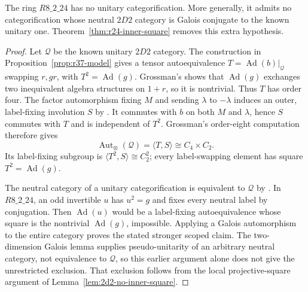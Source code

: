 \begin{proposition}\label{prop:scoped-eight}
The ring $R8\_2\_24$ has no unitary categorification. More
generally, it admits no categorification
whose neutral $2D2$ category is Galois conjugate to the known unitary
one. Theorem~\ref{thm:r24-inner-square} removes this extra hypothesis.
\end{proposition}
\begin{proof}
Let $\mathcal Q$ be the known unitary $2D2$ category. The
construction in Proposition~\ref{prop:r37-model} gives a tensor
autoequivalence $T=\operatorname{Ad}(b)|_{\mathcal Q}$ swapping
$r,gr$, with $T^2=\operatorname{Ad}(g)$. Grossman's
\cite[Lemma~4.1]{Grossman} shows that $\operatorname{Ad}(g)$ exchanges
two inequivalent algebra structures on $1+r$, so it is nontrivial.
Thus $T$ has order four. The factor automorphism fixing $M$ and
sending $\lambda$ to $-\lambda$ induces an outer, label-fixing
involution $S$ by \cite[Lemma~4.2]{Grossman}. It commutes with $b$
on both $M$ and $\lambda$, hence $S$ commutes with $T$ and is
independent of $T^2$. Grossman's order-eight computation
\cite[Theorem~4.19 and its proof]{Grossman} therefore gives
\[
\operatorname{Aut}_{\otimes}(\mathcal Q)=\langle T,S\rangle
 \cong C_4\times C_2.
\]
Its label-fixing subgroup is $\langle T^2,S\rangle\cong C_2^2$;
every label-swapping element has square $T^2=\operatorname{Ad}(g)$.

The neutral category of a unitary categorification is equivalent to
$\mathcal Q$ by \cite[Theorem~3.31]{EIP}. In $R8\_2\_24$, an odd
invertible $u$ has $u^2=g$ and fixes every neutral label by conjugation.
Then $\operatorname{Ad}(u)$ would be a label-fixing autoequivalence
whose square is the nontrivial $\operatorname{Ad}(g)$, impossible.
Applying a Galois automorphism to the entire category
proves the stated stronger scoped claim. The two-dimension Galois
lemma supplies pseudo-unitarity of an arbitrary neutral category,
not equivalence to $\mathcal Q$, so this earlier argument alone does not
give the unrestricted exclusion. That exclusion follows from the local
projective-square argument of Lemma~\ref{lem:2d2-no-inner-square}.
\end{proof}
